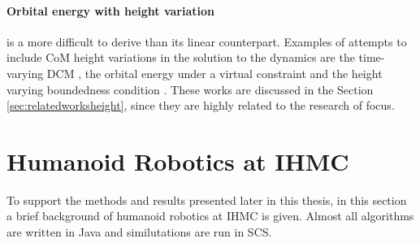\paragraph{Orbital energy with height variation}\label{subsec:nonorbit} is a more difficult to derive than its linear counterpart.  Examples of attempts to include \ac{CoM} height variations in the solution to the dynamics are the time-varying \ac{DCM} \cite{hopkins2014humanoid}, the orbital energy under a virtual constraint \cite{pratt2007derivation} and the height varying boundedness condition \cite{caron2018balance}. These works are discussed in the Section 
\ref{sec:relatedworksheight}, since they are highly related to the research of focus.

\section{Humanoid Robotics at IHMC}\label{sec:ihmc}
To support the methods and results presented later in this thesis, in this section a brief background of humanoid robotics at \ac{IHMC} is given. Almost all algorithms are written in Java and similutations are run in \ac{SCS}.
